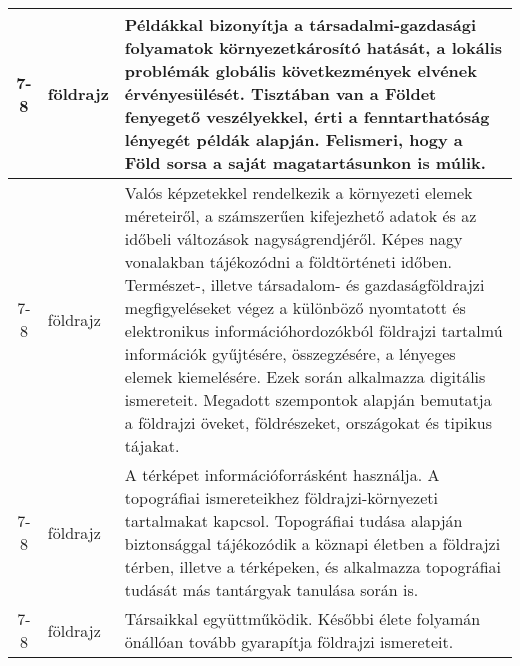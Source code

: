 \begin{small}
\begin{longtable}{c | p{2cm} |  p{11cm} }
              7-8 & földrajz & Példákkal bizonyítja a társadalmi-gazdasági folyamatok környezetkárosító hatását, a lokális problémák globális következmények elvének érvényesülését. Tisztában van a Földet fenyegető veszélyekkel, érti a fenntarthatóság lényegét példák alapján. Felismeri, hogy a Föld sorsa a saját magatartásunkon is múlik. \\ \hline
              7-8 & földrajz & Valós képzetekkel rendelkezik a környezeti elemek méreteiről, a számszerűen kifejezhető adatok és az időbeli változások nagyságrendjéről. Képes nagy vonalakban tájékozódni a földtörténeti időben. Természet-, illetve társadalom- és gazdaságföldrajzi megfigyeléseket végez a különböző nyomtatott és elektronikus információhordozókból földrajzi tartalmú információk gyűjtésére, összegzésére, a lényeges elemek kiemelésére. Ezek során alkalmazza digitális ismereteit. Megadott szempontok alapján bemutatja a földrajzi öveket, földrészeket, országokat és tipikus tájakat. \\ \hline
              7-8 & földrajz & A térképet információforrásként használja. A topográfiai ismereteikhez földrajzi-környezeti tartalmakat kapcsol. Topográfiai tudása alapján biztonsággal tájékozódik a köznapi életben a földrajzi térben, illetve a térképeken, és alkalmazza topográfiai tudását más tantárgyak tanulása során is. \\ \hline
              7-8 & földrajz & Társaikkal együttműködik. Későbbi élete folyamán önállóan tovább gyarapítja földrajzi ismereteit. \\ \hline
      \end{longtable}
\end{small}



